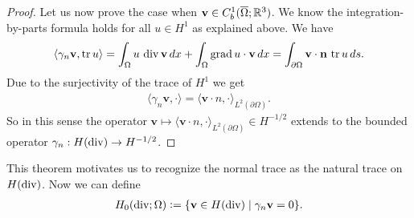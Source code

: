\documentclass[../master_thesis.tex]{subfiles}
\begin{document}
\begin{proof}
    Let us now prove the case when $\mathbf{v} \in C_b^1(\overline{\Omega}; \mathbb{R}^3)$.
    We know the integration-by-parts formula holds for all $u \in H^1$ as 
    explained above. We have
    \begin{align*}
        \langle \gamma_n \mathbf{v}, \operatorname{tr} u \rangle = 
        \int_\Omega u \, \operatorname{div} \mathbf{v} \, dx 
            + \int_\Omega \operatorname{grad} u \cdot \mathbf{v} \, dx
        = \int_{\partial \Omega} \mathbf{v}\cdot \mathbf{n} \, \operatorname{tr} u \, ds.
    \end{align*}
    Due to the surjectivity of the trace of $H^1$ we get 
    \begin{align*}
        \langle \gamma_n \mathbf{v}, \cdot \rangle = \langle \mathbf{v} \cdot n, \cdot \rangle_{L^2(\partial\Omega)}.
    \end{align*}
    So in this sense the operator $\mathbf{v} \mapsto \langle \mathbf{v} \cdot n, \cdot \rangle_{L^2(\partial\Omega)} 
    \in H^{-1/2}$ extends to the bounded operator $\gamma_n: H(\operatorname{div}) \rightarrow H^{-1/2}$.
\end{proof}
This theorem motivates us to recognize the normal trace as the natural trace 
on $H(\operatorname{div})$. Now we can define 
\begin{align*}
    H_0(\operatorname{div};\Omega) \vcentcolon= \{ \mathbf{v} \in H(\operatorname{div}) \mid \gamma_n \mathbf{v}=0 \}.
\end{align*}

\end{document}
